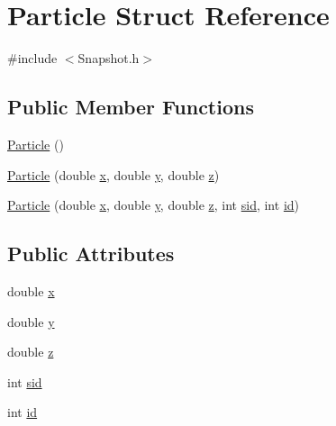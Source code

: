 \hypertarget{structParticle}{}\section{Particle Struct Reference}
\label{structParticle}


{\ttfamily \#include $<$Snapshot.\+h$>$}

\subsection*{Public Member Functions}
\begin{DoxyCompactItemize}
\item 
\hyperlink{structParticle_a40f4c7e248029d72e7714b7802d5e5e1}{Particle} ()
\item 
\hyperlink{structParticle_aff10ecc0bc5be8c67647fabecc655da0}{Particle} (double \hyperlink{structParticle_a1e3e5e103cee69ae9acb9c3269d009d7}{x}, double \hyperlink{structParticle_a434ab690dde4422ac74ae10f6ace7a52}{y}, double \hyperlink{structParticle_a518399a50ebdd632b22d7f48e5958461}{z})
\item 
\hyperlink{structParticle_ad97fe901c5f97da5d9b0d89cfb0a6603}{Particle} (double \hyperlink{structParticle_a1e3e5e103cee69ae9acb9c3269d009d7}{x}, double \hyperlink{structParticle_a434ab690dde4422ac74ae10f6ace7a52}{y}, double \hyperlink{structParticle_a518399a50ebdd632b22d7f48e5958461}{z}, int \hyperlink{structParticle_a4eb60d0df70f20b30af6ff967579fa65}{sid}, int \hyperlink{structParticle_a544b202775517f8ba05efcb9e0a21bee}{id})
\end{DoxyCompactItemize}
\subsection*{Public Attributes}
\begin{DoxyCompactItemize}
\item 
double \hyperlink{structParticle_a1e3e5e103cee69ae9acb9c3269d009d7}{x}
\item 
double \hyperlink{structParticle_a434ab690dde4422ac74ae10f6ace7a52}{y}
\item 
double \hyperlink{structParticle_a518399a50ebdd632b22d7f48e5958461}{z}
\item 
int \hyperlink{structParticle_a4eb60d0df70f20b30af6ff967579fa65}{sid}
\item 
int \hyperlink{structParticle_a544b202775517f8ba05efcb9e0a21bee}{id}
\end{DoxyCompactItemize}


